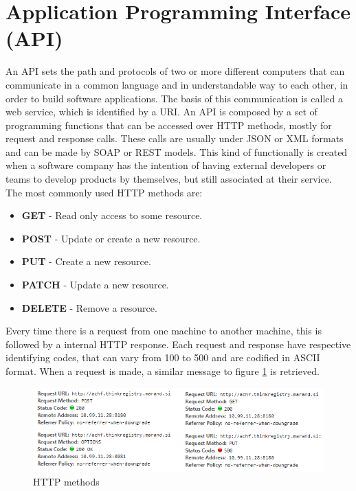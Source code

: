 \documentclass[mim_thesis.tex]{subfiles}
\begin{document}
\section{Application Programming Interface (API)}
An API sets the path and protocols of two or more different computers that can communicate in a common language and in understandable way to each other, in order to build software applications. The basis of this communication is called a web service, which is identified by a \ac{URI}. An API is composed by a set of programming functions that can be accessed over HTTP methods, mostly for request and response calls. These calls are usually under \ac{JSON} or \ac{XML} formats and can be made by \ac{SOAP} or \ac{REST} models. 
This kind of functionally is created when a software company has the intention of having external developers or teams to develop products by themselves, but still associated at their service.\\

The most commonly used HTTP methods are:
\begin{itemize}[noitemsep]
\item \textbf{GET} - Read only access to some resource.
\item \textbf{POST} - Update or create a new resource.
\item \textbf{PUT} - Create a new resource.
\item \textbf{PATCH} - Update a new resource.
\item \textbf{DELETE} - Remove a resource.
\end{itemize}

Every time there is a request from one machine to another machine, this is followed by a internal HTTP response. Each request and response have respective identifying codes, that can vary from 100 to 500 and are codified in ASCII format. When a request is made, a similar message to figure \ref{fig:http_methods} is retrieved.

\begin{figure}[H]
	\centering
    \includegraphics[width=1\textwidth]{img/http_methods.PNG}
	\caption{HTTP methods}
	\label{fig:http_methods}
\end{figure}
\end{document}
